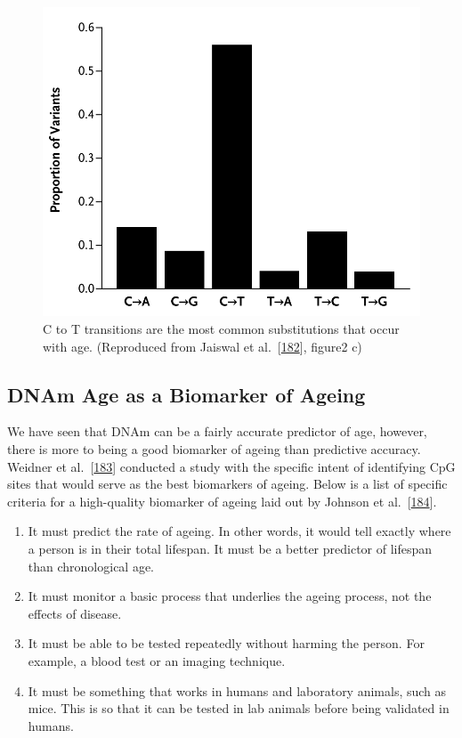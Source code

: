 \documentclass[
]{book}
\providecommand{\tightlist}{%
  \setlength{\itemsep}{0pt}\setlength{\parskip}{0pt}}
\begin{document}
\begin{figure}

{\centering \includegraphics[width=0.6\linewidth]{figs/Jaiswal2014fig2c} 

}

\caption{C to T transitions are the most common substitutions that occur with age. (Reproduced from Jaiswal et al.~{[}\protect\hyperlink{ref-Jaiswal2014c}{182}{]}, figure2 c)}\label{fig:Jaiswal2014fig2c}
\end{figure}



\hypertarget{dnam-age-as-a-biomarker-of-ageing}{%
\subsection{DNAm Age as a Biomarker of Ageing}\label{dnam-age-as-a-biomarker-of-ageing}}

We have seen that DNAm can be a fairly accurate predictor of age, however, there is more to being a good biomarker of ageing than predictive accuracy.
Weidner et al.~{[}\protect\hyperlink{ref-Weidner2014}{183}{]} conducted a study with the specific intent of identifying CpG sites that would serve as the best biomarkers of ageing.
Below is a list of specific criteria for a high-quality biomarker of ageing laid out by Johnson et al.~{[}\protect\hyperlink{ref-Johnson2006}{184}{]}.

\begin{enumerate}
\def\labelenumi{\arabic{enumi}.}
\tightlist
\item
  It must predict the rate of ageing. In other words, it would tell exactly where a person is in their total lifespan. It must be a better predictor of lifespan than chronological age.
\item
  It must monitor a basic process that underlies the ageing process, not the effects of disease.
\item
  It must be able to be tested repeatedly without harming the person. For example, a blood test or an imaging technique.
\item
  It must be something that works in humans and laboratory animals, such as mice. This is so that it can be tested in lab animals before being validated in humans.
\end{enumerate}
\end{document}
